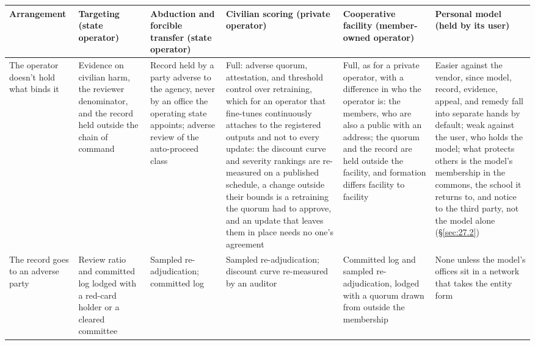 \begingroup\small\renewcommand{\arraystretch}{1.12}
\begin{longtable}{@{}>{\raggedright\arraybackslash}p{}>{\raggedright\arraybackslash}p{}>{\raggedright\arraybackslash}p{}>{\raggedright\arraybackslash}p{}>{\raggedright\arraybackslash}p{}>{\raggedright\arraybackslash}p{}@{}}
\hline
\textbf{Arrangement} & \textbf{Targeting (state operator)} & \textbf{Abduction and forcible transfer (state operator)} & \textbf{Civilian scoring (private operator)} & \textbf{Cooperative facility (member-owned operator)} & \textbf{Personal model (held by its user)} \\
\hline
\endhead
The operator doesn't hold what binds it & Evidence on civilian harm, the reviewer denominator, and the record held outside the chain of command & Record held by a party adverse to the agency, never by an office the operating state appoints; adverse review of the auto-proceed class & Full: adverse quorum, attestation, and threshold control over retraining, which for an operator that fine-tunes continuously attaches to the registered outputs and not to every update: the discount curve and severity rankings are re-measured on a published schedule, a change outside their bounds is a retraining the quorum had to approve, and an update that leaves them in place needs no one's agreement & Full, as for a private operator, with a difference in who the operator is: the members, who are also a public with an address; the quorum and the record are held outside the facility, and formation differs facility to facility & Easier against the vendor, since model, record, evidence, appeal, and remedy fall into separate hands by default; weak against the user, who holds the model; what protects others is the model's membership in the commons, the school it returns to, and notice to the third party, not the model alone (\S\ref{sec:27.2}) \\ \hline
The record goes to an adverse party & Review ratio and committed log lodged with a red-card holder or a cleared committee & Sampled re-adjudication; committed log & Sampled re-adjudication; discount curve re-measured by an auditor & Committed log and sampled re-adjudication, lodged with a quorum drawn from outside the membership & None unless the model's offices sit in a network that takes the entity form \\ \hline

\end{longtable}

